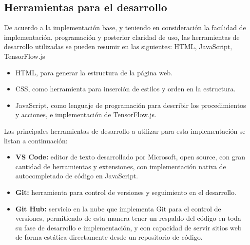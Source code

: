 \clearpage
\subsection{Herramientas para el desarrollo}

De acuerdo a la implementación base, y teniendo en consideración la facilidad de implementación, programación y posterior claridad de uso, las herramientas de desarrollo utilizadas se pueden resumir en las siguientes: HTML, JavaScript, TensorFlow.js

\begin{itemize}
  \item HTML, para generar la estructura de la página web.
  \item CSS, como herramienta para inserción de estilos y orden en la estructura.
  \item JavaScript, como lenguaje de programación para describir los procedimientos y acciones, e implementación de TensorFlow.js.
\end{itemize}



Las principales herramientas de desarrollo a utilizar para esta implementación se listan a continuación:

\begin{itemize}
  \item \textbf{VS Code:} editor de texto desarrollado por Microsoft, open source, con gran cantidad de herramientas y extensiones, con implementación nativa de autocompletado de código en JavaScript.
  \item \textbf{Git:} herramienta para control de versiones y seguimiento en el desarrollo.
  \item \textbf{Git Hub:} servicio en la nube que implementa Git para el control de versiones, permitiendo de esta manera tener un respaldo del código en toda su fase de desarrollo e implementación, y con capacidad de servir sitios web de forma estática directamente desde un repositorio de código.
\end{itemize}








